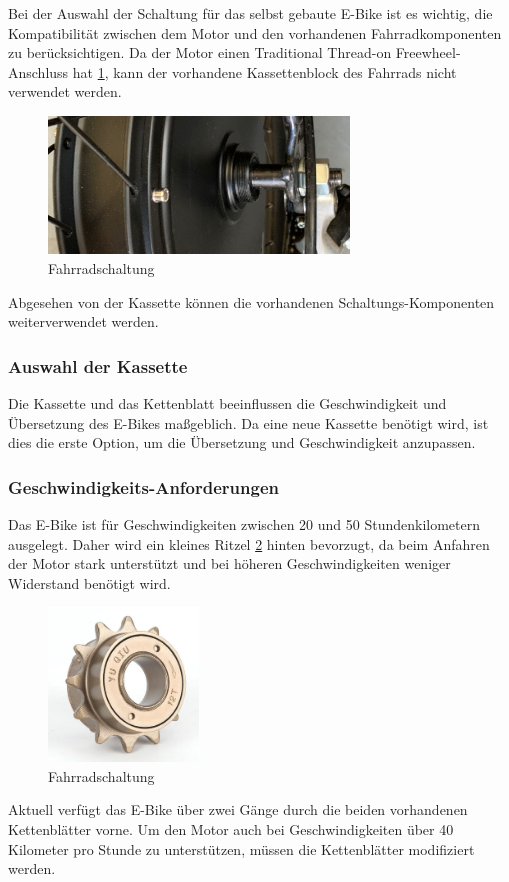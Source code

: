 Bei der Auswahl der Schaltung für das selbst gebaute E-Bike ist es wichtig, die Kompatibilität zwischen dem Motor und den vorhandenen Fahrradkomponenten zu berücksichtigen.
Da der Motor einen Traditional Thread-on Freewheel-Anschluss hat \ref{fig:25}, kann der vorhandene Kassettenblock des Fahrrads nicht verwendet werden.

\begin{figure}[h]
    \centering
    \includegraphics[width=8cm]{images/Radnabenmotoranschluss.jpg}
    \caption{Fahrradschaltung\cite{noauthor_schaltung_nodate}}
    \label{fig:25}
\end{figure}


Abgesehen von der Kassette können die vorhandenen Schaltungs-Komponenten weiterverwendet werden.

\subsubsection*{Auswahl der Kassette}
Die Kassette und das Kettenblatt beeinflussen die Geschwindigkeit und Übersetzung des E-Bikes maßgeblich.
Da eine neue Kassette benötigt wird, ist dies die erste Option, um die Übersetzung und Geschwindigkeit anzupassen.


\subsubsection*{Geschwindigkeits-Anforderungen}
Das E-Bike ist für Geschwindigkeiten zwischen 20 und 50 Stundenkilometern ausgelegt.
Daher wird ein kleines Ritzel \ref{fig:19} hinten bevorzugt, da beim Anfahren der Motor stark unterstützt und bei höheren Geschwindigkeiten weniger Widerstand benötigt wird.

\begin{figure}[h]
    \centering
    \includegraphics[width=4cm]{images/kleines Ritzel.png}
    \caption{Fahrradschaltung\cite{noauthor_423_nodate}}
    \label{fig:19}
\end{figure}

Aktuell verfügt das E-Bike über zwei Gänge durch die beiden vorhandenen Kettenblätter vorne.
Um den Motor auch bei Geschwindigkeiten über 40 Kilometer pro Stunde zu unterstützen, müssen die Kettenblätter modifiziert werden.




